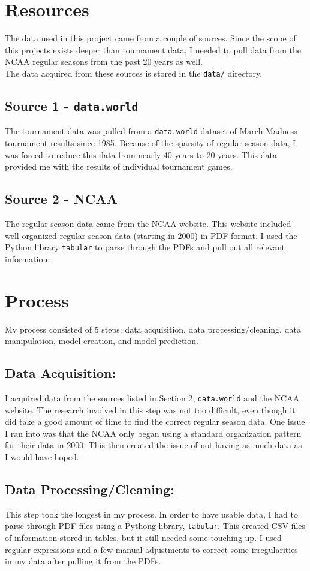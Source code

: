 \documentclass[10pt]{article}
\begin{document}
    \section{Resources}
    The data used in this project came from a couple of sources.  Since the scope of this projects exists deeper than tournament data, I needed to pull data from the NCAA regular seasons from the past 20 years as well.\\
    The data acquired from these sources is stored in the \texttt{data/} directory.
    \subsection{Source 1 - \texttt{data.world}}
        The tournament data was pulled from a \texttt{data.world} dataset of March Madness tournament results since 1985.  Because of the sparsity of regular season data, I was forced to reduce this data from nearly 40 years to 20 years.  This data provided me with the results of individual tournament games. 
    \subsection{Source 2 - NCAA}
        The regular season data came from the NCAA website.  This website included well organized regular season data (starting in 2000) in PDF format.  I used the Python library \texttt{tabular} to parse through the PDFs and pull out all relevant information.

\section{Process}
    My process consisted of 5 steps: data acquisition, data processing/cleaning, data manipulation, model creation, and model prediction.
    \subsection{\textbf{Data Acquisition:}}
        I acquired data from the sources listed in Section 2, \texttt{data.world} and the NCAA website.  The research involved in this step was not too difficult, even though it did take a good amount of time to find the correct regular season data.  One issue I ran into was that the NCAA only began using a standard organization pattern for their data in 2000.  This then created the issue of not having as much data as I would have hoped.
    \subsection{\textbf{Data Processing/Cleaning:}}
        This step took the longest in my process.  In order to have usable data, I had to parse through PDF files using a Pythong library, \texttt{tabular}.  This created CSV files of information stored in tables, but it still needed some touching up.  I used regular expressions and a few manual adjustments to correct some irregularities in my data after pulling it from the PDFs.
\end{document}
